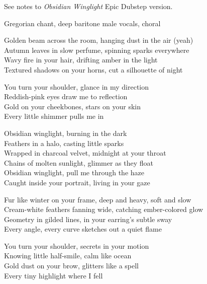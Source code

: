 

\begin{notes}
See notes to \emph{Obsidian Winglight} Epic Dubstep version.
\end{notes}
\begin{style}
Gregorian chant, deep baritone male vocals, choral 
\end{style}
\begin{lyrics}
Golden beam across the room, hanging dust in the air (yeah)\\
Autumn leaves in slow perfume, spinning sparks everywhere\\
Wavy fire in your hair, drifting amber in the light\\
Textured shadows on your horns, cut a silhouette of night

You turn your shoulder, glance in my direction\\
Reddish-pink eyes draw me to reflection\\
Gold on your cheekbones, stars on your skin\\
Every little shimmer pulls me in

Obsidian winglight, burning in the dark\\
Feathers in a halo, casting little sparks\\
Wrapped in charcoal velvet, midnight at your throat\\
Chains of molten sunlight, glimmer as they float\\
Obsidian winglight, pull me through the haze\\
Caught inside your portrait, living in your gaze

Fur like winter on your frame, deep and heavy, soft and slow\\
Cream-white feathers fanning wide, catching ember-colored glow\\
Geometry in gilded lines, in your earring’s subtle sway\\
Every angle, every curve sketches out a quiet flame

You turn your shoulder, secrets in your motion\\
Knowing little half-smile, calm like ocean\\
Gold dust on your brow, glitters like a spell\\
Every tiny highlight where I fell


\end{lyrics}
